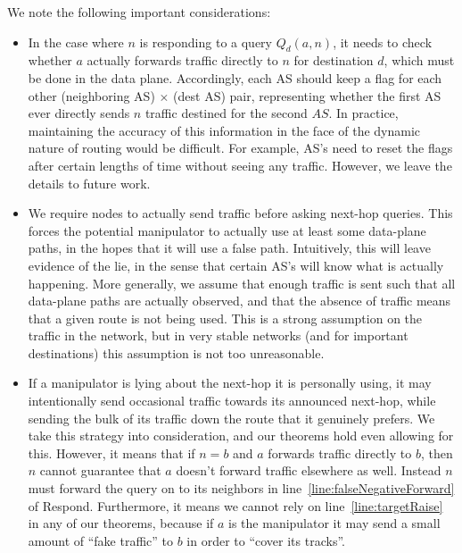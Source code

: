 \documentclass[pdftex,twoside,twocolumn,10pt,letterpaper]{article}
\begin{document}
  We note the following important considerations:
  \begin{itemize}
    \item In the case where $n$ is responding to a query $Q_d(a,n)$, it needs to
      check whether $a$ actually forwards traffic directly to $n$ for
      destination $d$, which must be done in the data plane. Accordingly, each
      AS should keep a flag for each other (neighboring AS) $\times$ (dest AS)
      pair, representing whether the first AS ever directly sends $n$ traffic
      destined for the second $AS$.
      In practice, maintaining the accuracy of this information in the
      face of the dynamic nature of routing would be difficult.
      For example, AS's need to reset the flags after certain lengths of time
      without seeing any traffic.
      However, we leave the details to future work.

    \item We require nodes to actually send traffic before asking next-hop
      queries. This forces the potential manipulator to actually use at least
      some data-plane paths, in the hopes that it will use a false path.
      Intuitively, this will leave evidence of the lie, in the sense that
      certain AS's will know what is actually happening.
      More generally, we assume that enough traffic is sent such that
      all data-plane paths are actually observed, and
      that the absence of traffic means that a given route is not
      being used. This is a strong assumption on the traffic in the network, but
      in very stable networks (and for important destinations) this assumption
      is not too unreasonable.

    \item If a manipulator is lying about the next-hop it is personally using,
      it may intentionally send occasional traffic towards its announced
      next-hop, while sending the bulk of its traffic down the route that it
      genuinely prefers. We take this strategy into consideration, and our
      theorems hold even allowing for this.
      However, it means that if $n=b$ and $a$ forwards traffic directly to $b$,
      then $n$ cannot guarantee that $a$ doesn't forward traffic elsewhere as well.
      Instead $n$ must forward the query on to its neighbors
      in line~\ref{line:falseNegativeForward} of {\sc Respond}.
      Furthermore, it means we cannot rely on line~\ref{line:targetRaise}
      in any of our theorems, because if $a$ is the manipulator
      it may send a small amount of ``fake traffic'' to $b$
      in order to ``cover its tracks''.
  \end{itemize}
\end{document}
